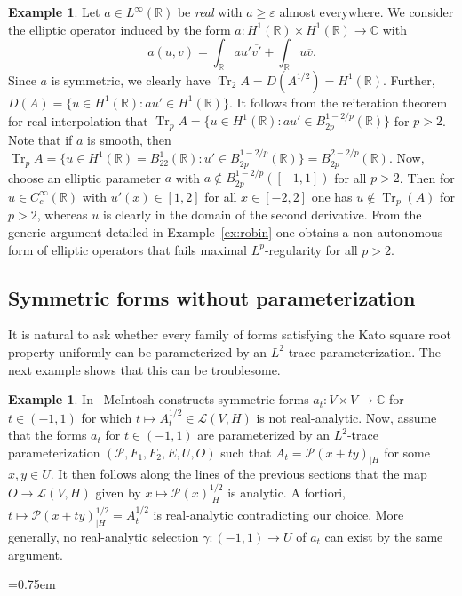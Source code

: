\documentclass[reqno,a4paper,final]{amsart}
\numberwithin{equation}{section}
\theoremstyle{definition}
\newtheorem{example}[lemma]{Example}
\begin{document}
	\begin{example}
		Let $a \in L^{\infty}({\mathbb{R}})$ be \emph{real} with $a \ge {\varepsilon}$ almost everywhere. We consider the elliptic operator induced by the form $a\colon H^1({\mathbb{R}}) \times H^1({\mathbb{R}}) \to {\mathbb{C}}$ with
		\begin{equation*}
			a(u,v) = \int_{\mathbb{R}} a u' \overline{v'} + \int_{\mathbb{R}} u \overline{v}.
		\end{equation*}
		Since $a$ is symmetric, we clearly have $\operatorname{Tr}_2 A = D(A^{1/2}) = H^{1}({\mathbb{R}})$. Further, $D(A) = \{ u \in H^1({\mathbb{R}}): au' \in H^{1}({\mathbb{R}}) \}$. It follows from the reiteration theorem for real interpolation that $\operatorname{Tr}_p A = \{ u \in H^{1}({\mathbb{R}}): au' \in B^{1-2/p}_{2p}({\mathbb{R}}) \}$ for $p > 2$. Note that if $a$ is smooth, then $\operatorname{Tr}_p A = \{ u \in H^1({\mathbb{R}}) = B^{1}_{22}({\mathbb{R}}): u' \in B^{1-2/p}_{2p}({\mathbb{R}}) \} = B^{2-2/p}_{2p}({\mathbb{R}})$. Now, choose an elliptic parameter $a$ with $a \not\in B_{2p}^{1-2/p}([-1,1])$ for all $p > 2$. Then for $u \in C_c^{\infty}({\mathbb{R}})$ with $u'(x) \in [1,2]$ for all $x \in [-2,2]$ one has $u \not\in \operatorname{Tr}_p(A)$ for $p > 2$, whereas $u$ is clearly in the domain of the second derivative. From the generic argument detailed in Example~\ref{ex:robin} one obtains a non-autonomous form of elliptic operators that fails maximal $L^p$-regularity for all $p > 2$.
	\end{example}
	
	\subsection{Symmetric forms without parameterization}
	
	It is natural to ask whether every family of forms satisfying the Kato square root property uniformly can be parameterized by an $L^2$-trace parameterization. The next example shows that this can be troublesome.
	
	\begin{example}
		In~\cite[Section~4]{McI90} McIntosh constructs symmetric forms $a_t\colon V \times V \to {\mathbb{C}}$ for $t \in (-1,1)$ for which $t \mapsto A_t^{1/2} \in \mathcal{L}(V,H)$ is not real-analytic. Now, assume that the forms $a_t$ for $t \in (-1,1)$ are parameterized by an $L^2$-trace parameterization $(\mathcal{P}, F_1 , F_2, E, U, O)$ such that $A_t = \mathcal{P}(x+ty)_{|H}$ for some $x,y \in U$. It then follows along the lines of the previous sections that the map $O \to \mathcal{L}(V,H)$ given by $x \mapsto \mathcal{P}(x)_{|H}^{1/2}$ is analytic. A fortiori, $t \mapsto \mathcal{P}(x+ty)_{|H}^{1/2} = A_t^{1/2}$ is real-analytic contradicting our choice. More generally, no real-analytic selection $\gamma\colon (-1,1) \to U$ of $a_t$ can exist by the same argument. 
	\end{example}
						
	\emergencystretch=0.75em
	\printbibliography
\end{document}
